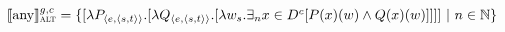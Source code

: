 $\intension[g,c]{any}_\text{\scshape alt}=\{[\lambda{P_{\langle e,\langle s,t\rangle\rangle}}.[\lambda{Q_{\langle e,\langle s,t\rangle\rangle}}.[\lambda{w_s}.\exists_n{x\in D^c}[P(x)(w)\land Q(x)(w)]]]]~|~n\in\mathbb{N}\}$